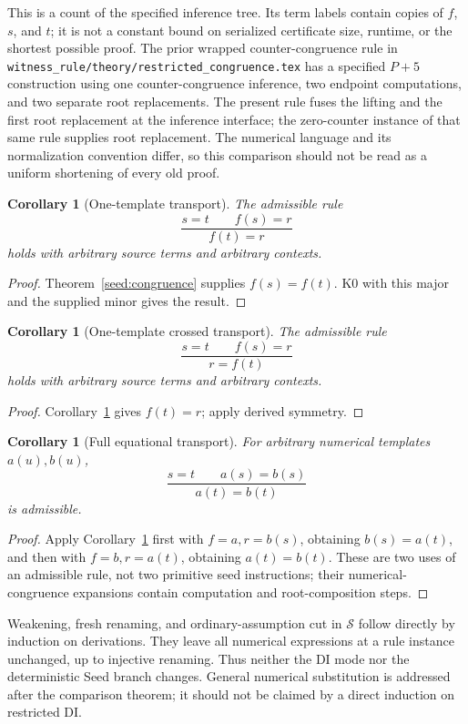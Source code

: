 \documentclass[11pt,a4paper]{article}
\newtheorem{corollary}[theorem]{Corollary}
\theoremstyle{definition}
\begin{document}
This is a count of the specified inference tree. Its term labels contain
copies of $f$, $s$, and $t$; it is not a constant bound on serialized
certificate size, runtime, or the shortest possible proof. The prior
wrapped counter-congruence rule in
\texttt{witness\_rule/theory/restricted\_congruence.tex} has a specified
$P+5$ construction using one counter-congruence inference, two endpoint
computations, and two separate root replacements. The present rule fuses
the lifting and the first root replacement at the inference interface;
the zero-counter instance of that same rule supplies root replacement.
The numerical language and its normalization convention differ, so this
comparison should not be read as a uniform shortening of every old proof.

\begin{corollary}[One-template transport]\label{seed:onesided}
The admissible rule
\[
 \frac{s=t\qquad f(s)=r}{f(t)=r}
\]
holds with arbitrary source terms and arbitrary contexts.
\end{corollary}
\begin{proof}
Theorem~\ref{seed:congruence} supplies $f(s)=f(t)$. K0 with this
major and the supplied minor gives the result.
\end{proof}

\begin{corollary}[One-template crossed transport]\label{seed:crossed}
The admissible rule
\[
 \frac{s=t\qquad f(s)=r}{r=f(t)}
\]
holds with arbitrary source terms and arbitrary contexts.
\end{corollary}
\begin{proof}
Corollary~\ref{seed:onesided} gives $f(t)=r$; apply derived symmetry.
\end{proof}

\begin{corollary}[Full equational transport]\label{seed:eqtransport}
For arbitrary numerical templates $a(u),b(u)$,
\[
 \frac{s=t\qquad a(s)=b(s)}{a(t)=b(t)}
\]
is admissible.
\end{corollary}
\begin{proof}
Apply Corollary~\ref{seed:crossed} first with $f=a,r=b(s)$,
obtaining $b(s)=a(t)$, and then with $f=b,r=a(t)$, obtaining
$a(t)=b(t)$. These are two uses of an admissible rule, not two
primitive seed instructions; their numerical-congruence expansions
contain computation and root-composition steps.
\end{proof}

Weakening, fresh renaming, and ordinary-assumption cut in $\mathcal S$
follow directly by induction on derivations. They leave all numerical
expressions at a rule instance unchanged, up to injective renaming.
Thus neither the DI mode nor the deterministic Seed branch changes.
General numerical substitution is addressed after the comparison theorem;
it should not be claimed by a direct induction on restricted DI.
\end{document}
